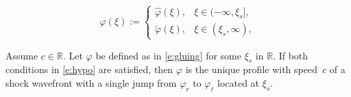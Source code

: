 \documentclass[10pt,a4paper]{amsart}
\renewcommand{\phi}{\varphi}
\begin{document}
\begin{equation}
\label{e:gluing}
\phi(\xi) := 
\begin{cases}
\hat\phi(\xi), & \xi \in (-\infty, \xi_s], \\%
\check\phi(\xi), & \xi \in (\xi_s, \infty),
\end{cases}
\end{equation}

\begin{lemma}
\label{l:converse}
Assume $c \in \mathbb{R}$. Let $\phi$ be defined as in \eqref{e:gluing} for some $\xi_s$ in $\mathbb{R}$. If both conditions in \eqref{e:hypo} are satisfied, then $\varphi$ is the unique profile with speed~$c$ of a shock wavefront with a single jump from $\varphi_r$ to $\varphi_\ell$ located at $\xi_s$.
\end{lemma}
\end{document}
